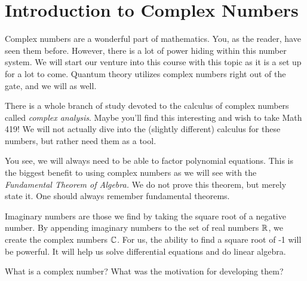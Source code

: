         
        \section{Introduction to Complex Numbers}
        
        Complex numbers are a wonderful part of mathematics.  You, as the reader, have seen them before.  However, there is a lot of power hiding within this number system.  We will start our venture into this course with this topic as it is a set up for a lot to come.  Quantum theory utilizes complex numbers right out of the gate, and we will as well.
        
        There is a whole branch of study devoted to the calculus of complex numbers called \emph{complex analysis}. Maybe you'll find this interesting and wish to take Math 419!  We will not actually dive into the (slightly different) calculus for these numbers, but rather need them as a tool.
        
        You see, we will always need to be able to factor polynomial equations. This is the biggest benefit to using complex numbers as we will see with the \emph{Fundamental Theorem of Algebra.} We do not prove this theorem, but merely state it. One should always remember fundamental theorems.
        
        Imaginary numbers are those we find by taking the square root of a negative number.  By appending imaginary numbers to the set of real numbers $\mathbb{R}$, we create the complex numbers $\mathbb{C}$. For us, the ability to find a square root of -1 will be powerful. It will help us solve differential equations and do linear algebra.
        
        \begin{question}
        What is a complex number? What was the motivation for developing them?
        \end{question}
        
